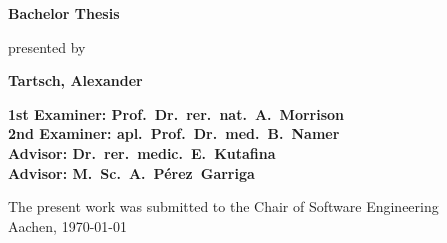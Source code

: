 \begin{titlepage}
\begin{flushleft}
{    {\Large \textbf{Bachelor Thesis}\\}
		\vspace{3em} 
		
		{\large presented by\\} 
    
    {\LARGE \textbf{Tartsch, Alexander}\\}
    \vspace{3em} 
		    
    {\Large \textbf{1st Examiner: Prof.\ Dr.\ rer.\ nat.\ A.\ Morrison}\\}
    \vspace{1em} 
    {\Large \textbf{2nd Examiner: apl.\ Prof.\ Dr.\ med.\ B.\ Namer}\\}
    \vspace{1em} 
    {\Large \textbf{Advisor: Dr.\ rer.\ medic.\ E.\ Kutafina}\\}
    \vspace{1em} 
    {\Large \textbf{Advisor: M.\ Sc.\ A.\ Pérez\ Garriga}\\}
    \vspace{7em} 

    {\large The present work was submitted to the Chair of Software Engineering \\}
    \vspace{1em}
		{\large	Aachen, \today\\}
  }
\end{flushleft}

\end{titlepage}





